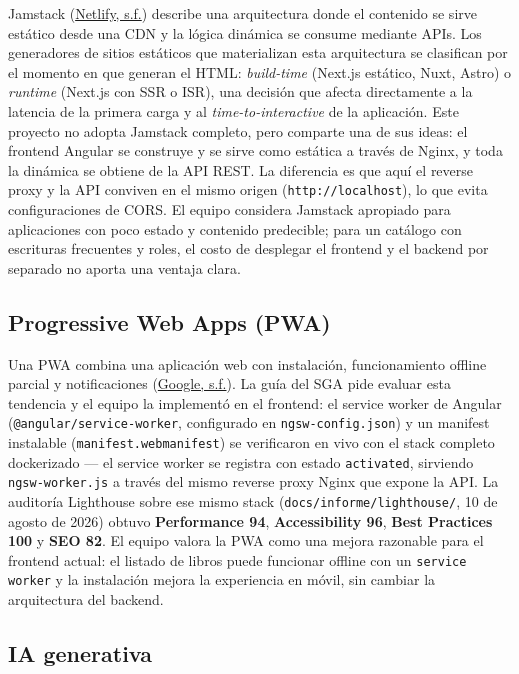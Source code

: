 \documentclass[12pt,a4paper]{article}
\begin{document}
Jamstack (\hyperlink{ref:netlify}{Netlify, s.f.}) describe una arquitectura donde el contenido se sirve estático desde una CDN y
la lógica dinámica se consume mediante APIs. Los generadores de sitios estáticos que
materializan esta arquitectura se clasifican por el momento en que generan el HTML:
\textit{build-time} (Next.js estático, Nuxt, Astro) o \textit{runtime} (Next.js con SSR o
ISR), una decisión que afecta directamente a la latencia de la primera carga y al
\textit{time-to-interactive} de la aplicación. Este proyecto no adopta Jamstack completo,
pero comparte una de sus ideas: el frontend Angular se construye y se sirve como
estática a través de Nginx, y toda la dinámica se obtiene de la API REST. La diferencia
es que aquí el reverse proxy y la API conviven en el mismo origen (\texttt{http://localhost}),
lo que evita configuraciones de CORS. El equipo considera Jamstack apropiado para
aplicaciones con poco estado y contenido predecible; para un catálogo con escrituras
frecuentes y roles, el costo de desplegar el frontend y el backend por separado no
aporta una ventaja clara.

\subsection{Progressive Web Apps (PWA)}

Una PWA combina una aplicación web con instalación, funcionamiento offline parcial y
notificaciones (\hyperlink{ref:google}{Google, s.f.}). La guía del SGA pide evaluar esta tendencia y el equipo la
implementó en el frontend: el service worker de Angular
(\texttt{@angular/service-worker}, configurado en \texttt{ngsw-config.json}) y un
manifest instalable (\texttt{manifest.webmanifest}) se verificaron en vivo con el stack
completo dockerizado — el service worker se registra con estado \texttt{activated},
sirviendo \texttt{ngsw-worker.js} a través del mismo reverse proxy Nginx que expone la
API. La auditoría Lighthouse sobre ese mismo stack (\texttt{docs/informe/lighthouse/},
10 de agosto de 2026) obtuvo \textbf{Performance 94}, \textbf{Accessibility 96},
\textbf{Best Practices 100} y \textbf{SEO 82}. El equipo valora la PWA como una mejora
razonable para el frontend actual: el listado de libros puede funcionar offline con un
\texttt{service worker} y la instalación mejora la experiencia en móvil, sin cambiar la
arquitectura del backend.

\subsection{IA generativa}
\end{document}
